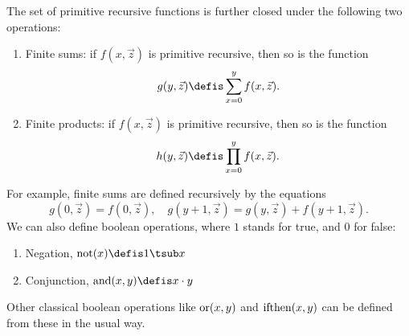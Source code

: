 \documentclass[../../include/open-logic-section]{subfiles}
\begin{document}
The set of primitive recursive functions is further closed under the
following two operations:
\begin{enumerate}
\item Finite sums: if $f(x,\vec z)$ is primitive recursive, then so is the
function
\[
g(y,\vec z) \defis \sum_{x = 0}^y f(x,\vec z).
\]
\item Finite products: if $f(x,\vec z)$ is primitive recursive, then so is the
function
\[
h(y,\vec z) \defis \prod_{x = 0}^y f(x,\vec z).
\]
\end{enumerate}
For example, finite sums are defined recursively by the equations
\[
g(0,\vec z) = f(0,\vec z), \quad g(y+1,\vec z) = g(y,\vec z) +
f(y+1,\vec z).
\]
We can also define boolean operations, where $1$ stands for true, and
$0$ for false:
\begin{enumerate}
\item Negation, $\fn{not}(x) \defis 1 \tsub x$
\item Conjunction, $\fn{and}(x,y) \defis x \cdot y$
\end{enumerate}
Other classical boolean operations like $\mathrm{or}(x,y)$ and
$\mathrm{ifthen}(x,y)$ can be defined from these in the usual way.
\end{document}
